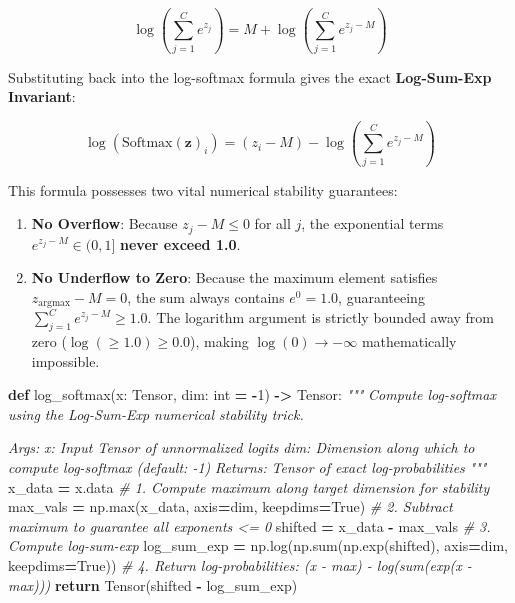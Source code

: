 \documentclass[
  letterpaper,
]{scrbook}
\newenvironment{Shaded}{\begin{snugshade}}{\end{snugshade}}
\newcommand{\BuiltInTok}[1]{#1}
\newcommand{\CommentTok}[1]{\textcolor[rgb]{0.56,0.35,0.01}{\textit{#1}}}
\newcommand{\ControlFlowTok}[1]{\textcolor[rgb]{0.13,0.29,0.53}{\textbf{#1}}}
\newcommand{\DecValTok}[1]{\textcolor[rgb]{0.00,0.00,0.81}{#1}}
\newcommand{\KeywordTok}[1]{\textcolor[rgb]{0.13,0.29,0.53}{\textbf{#1}}}
\newcommand{\NormalTok}[1]{#1}
\newcommand{\OperatorTok}[1]{\textcolor[rgb]{0.81,0.36,0.00}{\textbf{#1}}}
\newcommand{\VariableTok}[1]{\textcolor[rgb]{0.00,0.00,0.00}{#1}}
\providecommand{\tightlist}{%
  \setlength{\itemsep}{0pt}\setlength{\parskip}{0pt}}
\begin{document}
\[\log\left(\sum_{j=1}^C e^{z_j}\right) = M + \log\left(\sum_{j=1}^C e^{z_j - M}\right)\]

Substituting back into the log-softmax formula gives the exact
\textbf{Log-Sum-Exp Invariant}:

\[\log(\text{Softmax}(\mathbf{z})_i) = (z_i - M) - \log\left(\sum_{j=1}^C e^{z_j - M}\right)\]

This formula possesses two vital numerical stability guarantees:

\begin{enumerate}
\def\labelenumi{\arabic{enumi}.}
\tightlist
\item
  \textbf{No Overflow}: Because \(z_j - M \le 0\) for all \(j\), the
  exponential terms \(e^{z_j - M} \in (0, 1]\) \textbf{never exceed
  1.0}.
\item
  \textbf{No Underflow to Zero}: Because the maximum element satisfies
  \(z_{\text{argmax}} - M = 0\), the sum always contains \(e^0 = 1.0\),
  guaranteeing \(\sum_{j=1}^C e^{z_j - M} \ge 1.0\). The logarithm
  argument is strictly bounded away from zero
  (\(\log(\ge 1.0) \ge 0.0\)), making \(\log(0) \to -\infty\)
  mathematically impossible.
\end{enumerate}

\begin{Shaded}
\begin{Highlighting}[]
\KeywordTok{def}\NormalTok{ log\_softmax(x: Tensor, dim: }\BuiltInTok{int} \OperatorTok{=} \OperatorTok{{-}}\DecValTok{1}\NormalTok{) }\OperatorTok{{-}\textgreater{}}\NormalTok{ Tensor:}
    \CommentTok{"""}
\CommentTok{    Compute log{-}softmax using the Log{-}Sum{-}Exp numerical stability trick.}

\CommentTok{    Args:}
\CommentTok{        x: Input Tensor of unnormalized logits}
\CommentTok{        dim: Dimension along which to compute log{-}softmax (default: {-}1)}
\CommentTok{    Returns:}
\CommentTok{        Tensor of exact log{-}probabilities}
\CommentTok{    """}
\NormalTok{    x\_data }\OperatorTok{=}\NormalTok{ x.data}
    \CommentTok{\# 1. Compute maximum along target dimension for stability}
\NormalTok{    max\_vals }\OperatorTok{=}\NormalTok{ np.}\BuiltInTok{max}\NormalTok{(x\_data, axis}\OperatorTok{=}\NormalTok{dim, keepdims}\OperatorTok{=}\VariableTok{True}\NormalTok{)}
    \CommentTok{\# 2. Subtract maximum to guarantee all exponents \textless{}= 0}
\NormalTok{    shifted }\OperatorTok{=}\NormalTok{ x\_data }\OperatorTok{{-}}\NormalTok{ max\_vals}
    \CommentTok{\# 3. Compute log{-}sum{-}exp}
\NormalTok{    log\_sum\_exp }\OperatorTok{=}\NormalTok{ np.log(np.}\BuiltInTok{sum}\NormalTok{(np.exp(shifted), axis}\OperatorTok{=}\NormalTok{dim, keepdims}\OperatorTok{=}\VariableTok{True}\NormalTok{))}
    \CommentTok{\# 4. Return log{-}probabilities: (x {-} max) {-} log(sum(exp(x {-} max)))}
    \ControlFlowTok{return}\NormalTok{ Tensor(shifted }\OperatorTok{{-}}\NormalTok{ log\_sum\_exp)}
\end{Highlighting}
\end{Shaded}
\end{document}
